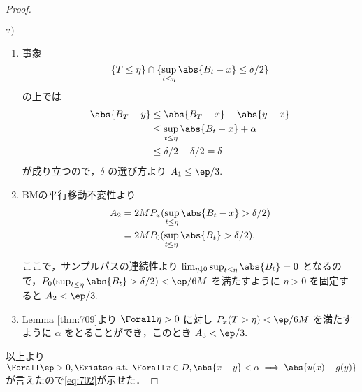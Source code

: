 \documentclass{jsarticle}
\begin{document}
\begin{proof}
    \begin{screen}
        $\because)$
        \begin{enumerate}[label=(\roman*)]
            \item 
            事象
            $$
            \{T\le\eta\}\cap\{\sup_{t\le\eta}\abs{B_t-x}\le\delta/2\}
            $$
            の上では
            \begin{align}
                \abs{B_T-y}
                &\le \abs{B_T-x}+\abs{y-x} \\
                &\le \sup_{t\le\eta}\abs{B_t-x}+\alpha \\
                &\le \delta/2+\delta/2
                =\delta
            \end{align}
            が成り立つので，$\delta$ の選び方より $A_1\le\ep/3.$
            \item
            BMの平行移動不変性より
            \begin{align}
                A_2
                &= 2MP_x(\sup_{t\le\eta}\abs{B_t-x}>\delta/2) \\
                &= 2MP_0(\sup_{t\le\eta}\abs{B_t}>\delta/2).
            \end{align}

            ここで，サンプルパスの連続性より $\lim_{\eta\downarrow0}\sup_{t\le\eta}\abs{B_t}=0$ となるので，$P_0(\sup_{t\le\eta}\abs{B_t}>\delta/2)<\ep/6M$ を満たすように $\eta>0$ を固定すると $A_2<\ep/3.$
            \item
            Lemma \ref{thm:709}より $\Forall \eta>0$ に対し $P_x(T>\eta)<\ep/6M$ を満たすように $\alpha$ をとることができ，このとき $A_3<\ep/3.$
        \end{enumerate}
    \end{screen}

    以上より $\Forall \ep>0, \Exists \alpha\text{ s.t. }\Forall x\in D,\abs{x-y}<\alpha\implies \abs{u(x)-g(y)}$ が言えたので\eqref{eq:702}が示せた．
\end{proof}
\end{document}
